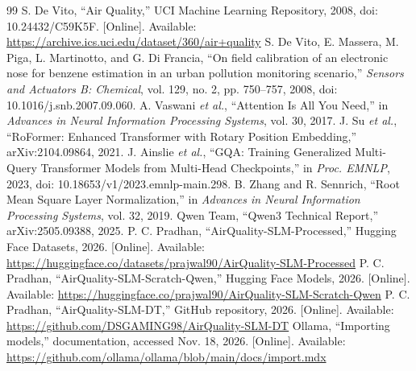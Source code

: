 \documentclass[conference,a4paper,10pt]{IEEEtran}
\begin{document}
\begin{thebibliography}{99}
 S. De Vito, ``Air Quality,'' UCI Machine Learning Repository, 2008, doi: 10.24432/C59K5F. [Online]. Available: \url{https://archive.ics.uci.edu/dataset/360/air+quality}
 S. De Vito, E. Massera, M. Piga, L. Martinotto, and G. Di Francia, ``On field calibration of an electronic nose for benzene estimation in an urban pollution monitoring scenario,'' \emph{Sensors and Actuators B: Chemical}, vol. 129, no. 2, pp. 750--757, 2008, doi: 10.1016/j.snb.2007.09.060.
 A. Vaswani \emph{et al.}, ``Attention Is All You Need,'' in \emph{Advances in Neural Information Processing Systems}, vol. 30, 2017.
 J. Su \emph{et al.}, ``RoFormer: Enhanced Transformer with Rotary Position Embedding,'' arXiv:2104.09864, 2021.
 J. Ainslie \emph{et al.}, ``GQA: Training Generalized Multi-Query Transformer Models from Multi-Head Checkpoints,'' in \emph{Proc. EMNLP}, 2023, doi: 10.18653/v1/2023.emnlp-main.298.
 B. Zhang and R. Sennrich, ``Root Mean Square Layer Normalization,'' in \emph{Advances in Neural Information Processing Systems}, vol. 32, 2019.
 Qwen Team, ``Qwen3 Technical Report,'' arXiv:2505.09388, 2025.
 P. C. Pradhan, ``AirQuality-SLM-Processed,'' Hugging Face Datasets, 2026. [Online]. Available: \url{https://huggingface.co/datasets/prajwal90/AirQuality-SLM-Processed}
 P. C. Pradhan, ``AirQuality-SLM-Scratch-Qwen,'' Hugging Face Models, 2026. [Online]. Available: \url{https://huggingface.co/prajwal90/AirQuality-SLM-Scratch-Qwen}
 P. C. Pradhan, ``AirQuality-SLM-DT,'' GitHub repository, 2026. [Online]. Available: \url{https://github.com/DSGAMING98/AirQuality-SLM-DT}
 Ollama, ``Importing models,'' documentation, accessed Nov. 18, 2026. [Online]. Available: \url{https://github.com/ollama/ollama/blob/main/docs/import.mdx}
\end{thebibliography}
\balance
\end{document}
